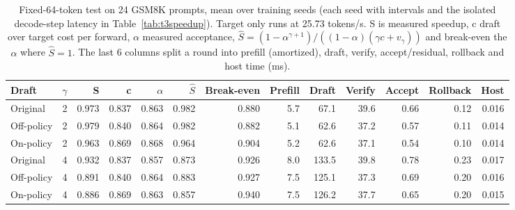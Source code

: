 \begin{table}[!htb]
\centering
\scriptsize
\setlength{\tabcolsep}{3.5pt}
\caption{Fixed-64-token test on 24 GSM8K prompts, mean over training seeds (each seed with intervals and the isolated decode-step latency in Table~\ref{tab:t3speedup}). Target only runs at 25.73 tokens/s. S is measured speedup, c draft over target cost per forward, $\alpha$ measured acceptance, $\hat S=(1-\alpha^{{\gamma+1}})/((1-\alpha)(\gamma c+v_\gamma))$ and break-even the $\alpha$ where $\hat S=1$. The last 6 columns split a round into prefill (amortized), draft, verify, accept/residual, rollback and host time (ms).}
\label{tab:t3speedupmean}
\begin{adjustbox}{max width=\linewidth}
\begin{tabular}{lrrrrrrrrrrrr}
\toprule
Draft & $\gamma$ & S & c & $\alpha$ & $\hat S$ & Break-even & Prefill & Draft & Verify & Accept & Rollback & Host \\
\midrule
Original & 2 & 0.973 & 0.837 & 0.863 & 0.982 & 0.880 & 5.7 & 67.1 & 39.6 & 0.66 & 0.12 & 0.016 \\
Off-policy & 2 & 0.979 & 0.840 & 0.864 & 0.982 & 0.882 & 5.1 & 62.6 & 37.2 & 0.57 & 0.11 & 0.014 \\
On-policy & 2 & 0.963 & 0.869 & 0.868 & 0.964 & 0.904 & 5.2 & 62.6 & 37.1 & 0.54 & 0.10 & 0.014 \\
\midrule
Original & 4 & 0.932 & 0.837 & 0.857 & 0.873 & 0.926 & 8.0 & 133.5 & 39.8 & 0.78 & 0.23 & 0.017 \\
Off-policy & 4 & 0.891 & 0.840 & 0.864 & 0.883 & 0.927 & 7.5 & 125.1 & 37.3 & 0.69 & 0.20 & 0.016 \\
On-policy & 4 & 0.886 & 0.869 & 0.863 & 0.857 & 0.940 & 7.5 & 126.2 & 37.7 & 0.65 & 0.20 & 0.015 \\
\bottomrule
\end{tabular}
\end{adjustbox}
\end{table}
